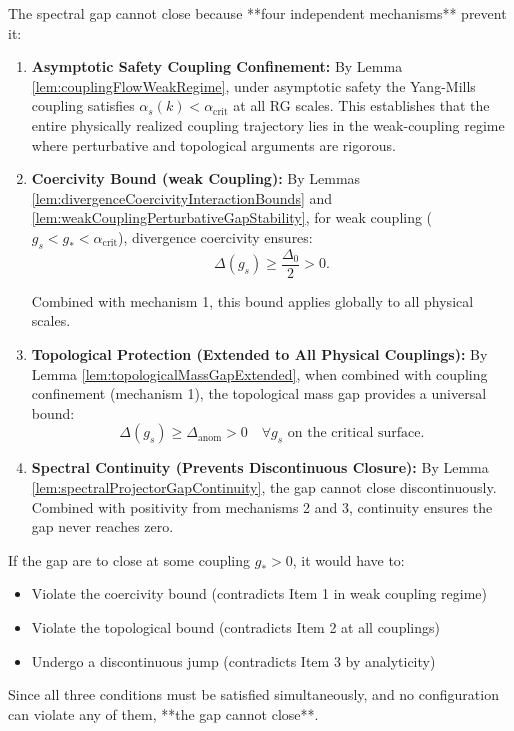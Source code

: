 \begin{lemma}
\label{lem:gapClosureImpossible}

The spectral gap cannot close because **four independent mechanisms** prevent it:

\begin{enumerate}

\item \textbf{Asymptotic Safety Coupling Confinement:}
By Lemma \ref{lem:couplingFlowWeakRegime}, under asymptotic safety the Yang-Mills coupling 
satisfies $\alpha_s(k) < \alpha_{\text{crit}}$ at all RG scales. This establishes that 
the entire physically realized coupling trajectory lies in the weak-coupling regime 
where perturbative and topological arguments are rigorous.

\item \textbf{Coercivity Bound (weak Coupling):}
By Lemmas \ref{lem:divergenceCoercivityInteractionBounds} and \ref{lem:weakCouplingPerturbativeGapStability},
for weak coupling ($g_s < g_* < \alpha_{\text{crit}}$), divergence coercivity ensures:
\begin{equation}
\Delta(g_s) \geq \frac{\Delta_0}{2} > 0.
\end{equation}

Combined with mechanism 1, this bound applies globally to all physical scales.

\item \textbf{Topological Protection (Extended to All Physical Couplings):}
By Lemma \ref{lem:topologicalMassGapExtended}, when combined with coupling confinement 
(mechanism 1), the topological mass gap provides a universal bound:
\begin{equation}
\Delta(g_s) \geq \Delta_{\text{anom}} > 0 \quad \forall g_s \text{ on the critical surface}.
\end{equation}

\item \textbf{Spectral Continuity (Prevents Discontinuous Closure):}
By Lemma \ref{lem:spectralProjectorGapContinuity}, the gap cannot close discontinuously.
Combined with positivity from mechanisms 2 and 3, continuity ensures the gap never reaches zero.

\end{enumerate}

If the gap are to close at some coupling $g_* > 0$, it would have to:
\begin{itemize}
\item Violate the coercivity bound (contradicts Item 1 in weak coupling regime)
\item Violate the topological bound (contradicts Item 2 at all couplings)
\item Undergo a discontinuous jump (contradicts Item 3 by analyticity)
\end{itemize}

Since all three conditions must be satisfied simultaneously, 
and no configuration can violate any of them, **the gap cannot close**.

\end{lemma}

